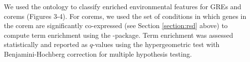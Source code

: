 We used the ontology to classify enriched environmental features for
GREs and corems (Figures 3-4). For corems, we used the set of
conditions in which genes in the corem are significantly co-expressed
(see Section \ref{section:rsd} above) to compute term enrichment using the 
\cite{Kurbatova2011}  -package. Term enrichment was assessed
statistically and reported as $q$-values using the hypergeometric test
with Benjamini-Hochberg correction for multiple hypothesis testing.

